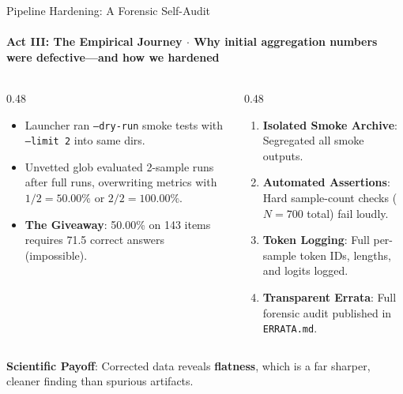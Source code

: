 \documentclass[aspectratio=169, 10pt]{beamer}
\begin{document}
\begin{frame}{Pipeline Hardening: A Forensic Self-Audit}
  \framesubtitle{Act III: The Empirical Journey $\cdot$ Why initial aggregation numbers were defective---and how we hardened}
  
  \begin{columns}[T]
    \begin{column}{0.48\textwidth}
      \begin{tcolorbox}[alertcard, title=\textbf{Defect Identification}]
        \small
        \begin{itemize}\setlength{\itemsep}{2pt}
          \item Launcher ran \texttt{--dry-run} smoke tests with \texttt{--limit 2} into same dirs.
          \item Unvetted glob evaluated 2-sample runs after full runs, overwriting metrics with $1/2 = 50.00\%$ or $2/2 = 100.00\%$.
          \item \textbf{The Giveaway}: 50.00\% on 143 items requires 71.5 correct answers (impossible).
        \end{itemize}
      \end{tcolorbox}
    \end{column}
    
    \begin{column}{0.48\textwidth}
      \begin{tcolorbox}[successcard, title=\textbf{Hardened Pipeline Controls}]
        \small
        \begin{enumerate}\setlength{\itemsep}{2pt}
          \item \textbf{Isolated Smoke Archive}: Segregated all smoke outputs.
          \item \textbf{Automated Assertions}: Hard sample-count checks ($N=700$ total) fail loudly.
          \item \textbf{Token Logging}: Full per-sample token IDs, lengths, and logits logged.
          \item \textbf{Transparent Errata}: Full forensic audit published in \texttt{ERRATA.md}.
        \end{enumerate}
      \end{tcolorbox}
    \end{column}
  \end{columns}
  
  \vspace{2pt}
  \begin{tcolorbox}[accentcard]
    \centering \scriptsize \textbf{Scientific Payoff}: Corrected data reveals \textbf{flatness}, which is a far sharper, cleaner finding than spurious artifacts.
  \end{tcolorbox}

\end{frame}
\end{document}
